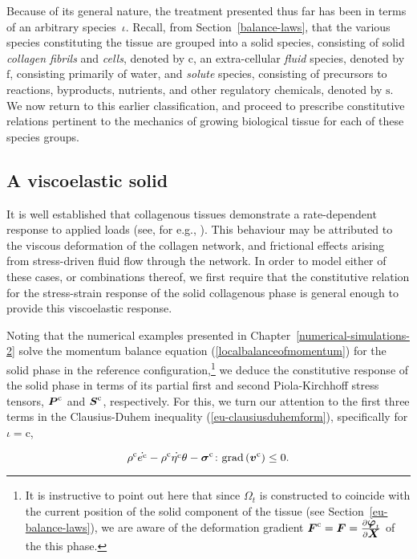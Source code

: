 Because of its general nature, the treatment presented thus far has been in
terms of an arbitrary species~$\iota$. Recall, from
Section~\ref{balance-laws}, that the various species constituting the
tissue are grouped into a solid species, consisting of solid
\emph{collagen fibrils} and \emph{cells}, denoted by $\mathrm{c}$, an
extra-cellular \emph{fluid} species, denoted by $\mathrm{f}$,
consisting primarily of water, and \emph{solute} species, consisting
of precursors to reactions, byproducts, nutrients, and other
regulatory chemicals, denoted by $\mathrm{s}$. We now return to this
earlier classification, and proceed to prescribe constitutive
relations pertinent to the mechanics of growing biological tissue for
each of these species groups.

\subsection{A viscoelastic solid}
\label{eu-viscoelastic-solid}

It is well established that collagenous tissues demonstrate a
rate-dependent response to applied loads (see, for e.g.,
\citet{Provenzanoetal:2001}). This behaviour may be attributed to the
viscous deformation of the collagen network, and frictional effects
arising from stress-driven fluid flow through the network. In order to
model either of these cases, or combinations thereof, we first require
that the constitutive relation for the stress-strain response of the
solid collagenous phase is general enough to provide this viscoelastic
response.

Noting that the numerical examples presented in
Chapter~\ref{numerical-simulations-2} solve the momentum balance
equation (\ref{localbalanceofmomentum}) for the solid phase in the
reference configuration,\footnote{It is instructive to point out here
  that since $\Omega_{t}$ is constructed to coincide with the current
  position of the solid component of the tissue (see
  Section~\ref{eu-balance-laws}), we are aware of the deformation
  gradient $\mbox{\boldmath$ F$}^{\mathrm{c}}=\mbox{\boldmath$ F$}=\frac{\partial \mbox{\boldmath$\varphi$}_{t}}{\partial
    \mbox{\boldmath$ X$}}$ of the this phase.} we deduce the constitutive response of
the solid phase in terms of its partial first and second
Piola-Kirchhoff stress tensors, $\mbox{\boldmath$ P$}^{\mathrm{c}}$ and
$\mbox{\boldmath$ S$}^{\mathrm{c}}$, respectively. For this, we turn our attention to
the first three terms in the Clausius-Duhem inequality
(\ref{eu-clausiusduhemform}), specifically for $\iota=\mathrm{c}$,

\begin{equation*}
\rho^{\mathrm{c}} \dot{e^{\mathrm{c}}}
- \rho^{\mathrm{c}} \dot{\eta^{\mathrm{c}}} \theta
-\mbox{\boldmath$\sigma$}^{\mathrm{c}}\colon\mathrm{grad}\left(\mbox{\boldmath$ v$}^{\mathrm{c}}\right)\leq 0.
\end{equation*}

